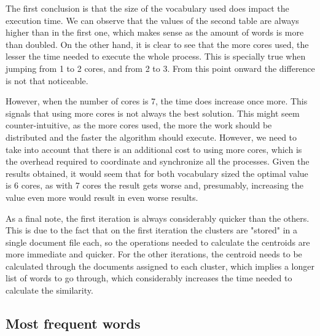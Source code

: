 The first conclusion is that the size of the vocabulary used does impact the execution time. We can observe that the values of the second table are always higher than in the first one, which makes sense as the amount of words is more than doubled. On the other hand, it is clear to see that the more cores used, the lesser the time needed to execute the whole process. This is specially true when jumping from 1 to 2 cores, and from 2 to 3. From this point onward the difference is not that noticeable.

However, when the number of cores is 7, the time does increase once more. This signals that using more cores is not always the best solution. This might seem counter-intuitive, as the more cores used, the more the work should be distributed and the faster the algorithm should execute. However, we need to take into account that there is an additional cost to using more cores, which is the overhead required to coordinate and synchronize all the processes. Given the results obtained, it would seem that for both vocabulary sized the optimal value is 6 cores, as with 7 cores the result gets worse and, presumably, increasing the value even more would result in even worse results.

As a final note, the first iteration is always considerably quicker than the others. This is due to the fact that on the first iteration the clusters are "stored" in a single document file each, so the operations needed to calculate the centroids are more immediate and quicker. For the other iterations, the centroid needs to be calculated through the documents assigned to each cluster, which implies a longer list of words to go through, which considerably increases the time needed to calculate the similarity.


\subsection{Most frequent words}

